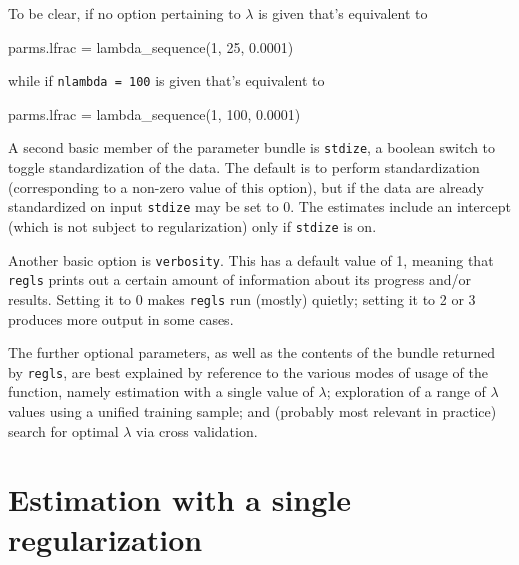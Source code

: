 \documentclass{article}
\begin{document}
To be clear, if no option pertaining to $\lambda$ is given that's
equivalent to
\begin{code}
parms.lfrac = lambda_sequence(1, 25, 0.0001)
\end{code}
while if \texttt{nlambda = 100} is given that's equivalent to
\begin{code}
parms.lfrac = lambda_sequence(1, 100, 0.0001)
\end{code}

A second basic member of the parameter bundle is \texttt{stdize}, a
boolean switch to toggle standardization of the data. The default is
to perform standardization (corresponding to a non-zero value of this
option), but if the data are already standardized on input
\texttt{stdize} may be set to 0.  The estimates include an intercept
(which is not subject to regularization) only if \texttt{stdize} is
on.

Another basic option is \texttt{verbosity}. This has a default value
of 1, meaning that \texttt{regls} prints out a certain amount of
information about its progress and/or results. Setting it to 0 makes
\texttt{regls} run (mostly) quietly; setting it to 2 or 3 produces
more output in some cases.

The further optional parameters, as well as the contents of the bundle
returned by \texttt{regls}, are best explained by reference to the
various modes of usage of the function, namely estimation with a
single value of $\lambda$; exploration of a range of $\lambda$ values
using a unified training sample; and (probably most relevant in
practice) search for optimal $\lambda$ via cross validation.

\section{Estimation with a single regularization}
\label{sec:single-lambda}
\end{document}
